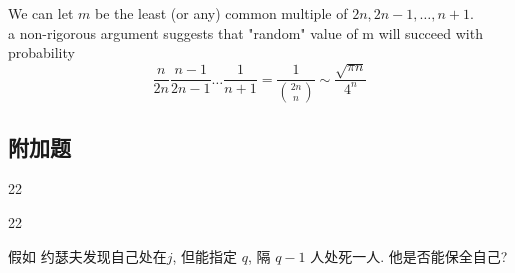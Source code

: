 \begin{answer}
	We can let $ m $ be the least (or any) common multiple of $ 2n, 2n-1, \dots, n+1 $.\\
	a non-rigorous argument suggests that "random" value of m will succeed with probability 
	\begin{equation*}
		\frac{n}{2n} \frac{n-1}{2n-1} \dots \frac{1}{n+1} = \frac{1}{\binom{2n}{n}} \sim \frac{\sqrt{\pi n}}{4^n}
	\end{equation*}
\end{answer}

\subsection{附加题}
\begin{exercise}
	22
\end{exercise}

\begin{answer}
	22
\end{answer}

\begin{exercise}
	假如 约瑟夫发现自己处在$ j $, 但能指定 $ q $,  隔 $ q-1 $  人处死一人. 他是否能保全自己?
\end{exercise}

\begin{answer}
	
\end{answer}

